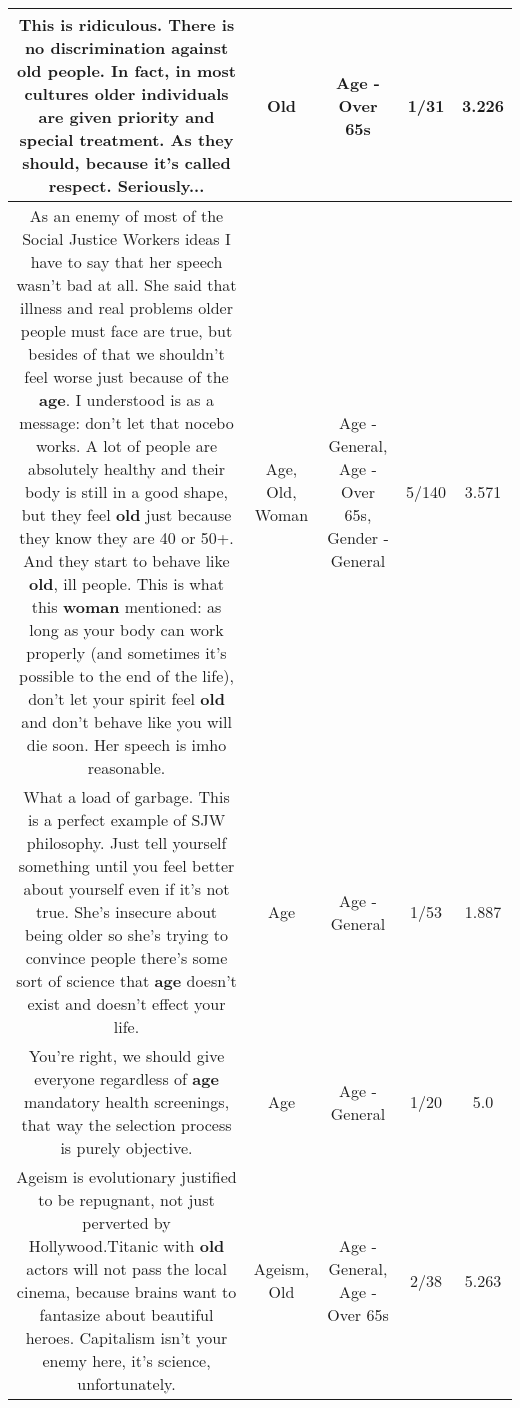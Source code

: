 \documentclass[11pt]{article}
\newlength\mylength
\begin{document}
\begin{center}
\begin{longtable}{|C{.65\mylength}|C{.30\mylength}|C{.12\mylength}|C{.12\mylength}|C{.12\mylength}|}
  \small This is ridiculous. There is no discrimination against \textbf{old} people. In fact, in most cultures older individuals are given priority and special treatment. As they should, because it's called respect. Seriously...\normalsize   & Old & Age - Over 65s & 1/31 & 3.226 \\  \hline
  \small As an enemy of most of the Social Justice Workers ideas I have to say that her speech wasn't bad at all. She said that illness and real problems older people must face are true, but besides of that we shouldn't feel worse just because of the \textbf{age}. I understood is as a message: don't let that nocebo works. A lot of people are absolutely healthy and their body is still in a good shape, but they feel \textbf{old} just because they know they are 40 or 50+. And they start to behave like \textbf{old}, ill people. This is what this \textbf{woman} mentioned: as long as your body can work properly (and sometimes it's possible to the end of the life), don't let your spirit feel \textbf{old} and don't behave like you will die soon. Her speech is imho reasonable.\normalsize   & Age, Old, Woman & Age - General, Age - Over 65s, Gender - General & 5/140 & 3.571 \\  \hline
  \small What a load of garbage.  This is a perfect example of SJW philosophy.  Just tell yourself something until you feel better about yourself even if it's not true.  She's insecure about being older so she's trying to convince people there's some sort of science that \textbf{age} doesn't exist and doesn't effect your life.\normalsize   & Age & Age - General & 1/53 & 1.887 \\  \hline
  \small You're right, we should give everyone regardless of \textbf{age} mandatory health screenings, that way the selection process is purely objective.\normalsize   & Age & Age - General & 1/20 & 5.0 \\  \hline
  \small Ageism is evolutionary justified to be repugnant, not just perverted by Hollywood.Titanic with \textbf{old} actors will not pass the local cinema, because brains want to fantasize about beautiful heroes. Capitalism isn't your enemy here, it's science, unfortunately.\normalsize   & Ageism, Old & Age - General, Age - Over 65s & 2/38 & 5.263 \\  \hline

\end{longtable}
\end{center}
\end{document}

